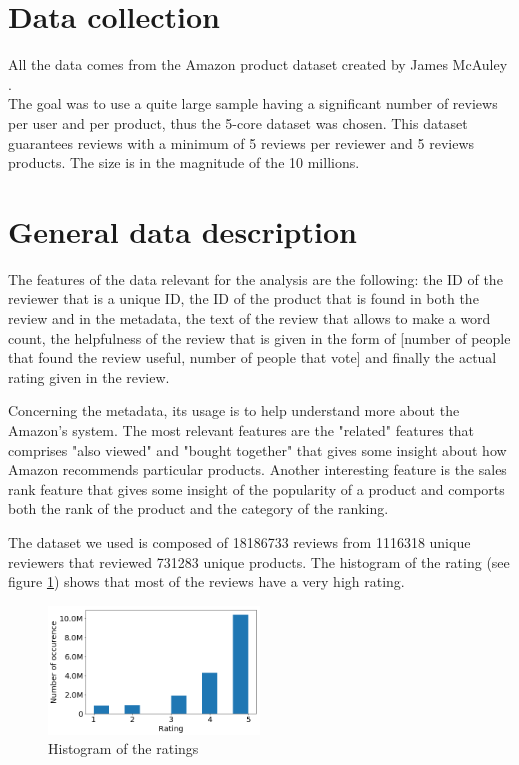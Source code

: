 \documentclass[11pt]{article}
\begin{document}
\section{Data collection}
All the data comes from the Amazon product dataset created by James McAuley \cite{mcauley2015image}.\\
 The goal was to use a quite large sample having a significant number of reviews per user and per product, thus the 5-core dataset was chosen. This dataset guarantees reviews with a minimum of 5 reviews per reviewer and 5 reviews products. The size is in the magnitude of the 10 millions.
\section{General data description}
The features of the data relevant for the analysis are the following: the ID of the reviewer that is a unique ID, the ID of the product that is found in both the review and in the metadata, the text of the review that allows to make a word count, the helpfulness of the review that is given in the form of [number of people that found the review useful, number of people that vote] and finally the actual rating given in the review.\par
 Concerning the metadata, its usage is to help understand more about the Amazon's system. The most relevant features are the "related" features that comprises "also viewed" and "bought together" that gives some insight about how Amazon recommends particular products. Another interesting feature is the sales rank feature that gives some insight of the popularity of a product and comports both the rank of the product and the category of the ranking.

The dataset we used is composed of 18186733 reviews from 1116318 unique reviewers that reviewed 731283 unique products. The histogram of the rating (see figure \ref{rating_hist}) shows that most of the reviews have a very high rating.
\begin{figure}[H]
\includegraphics[width=0.5\textwidth]{rating_hist.png}
\caption{Histogram of the ratings}
\label{rating_hist}
\end{figure}
\end{document}
